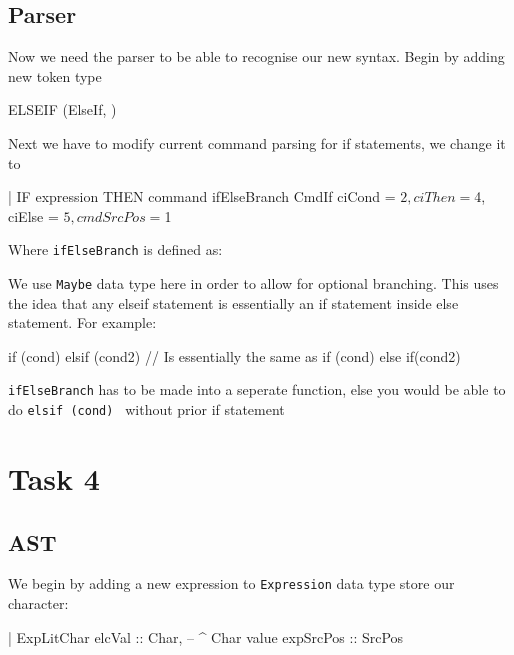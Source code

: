 \documentclass{article}
\begin{document}
\subsection{Parser}
\begin{flushleft}
Now we need the parser to be able to recognise our new syntax. Begin by adding new token type
\end{flushleft}
\begin{code}
ELSEIF      { (ElseIf, $$) }
\end{code}
\begin{flushleft}
Next we have to modify current command parsing for if statements, we change it to
\end{flushleft}
\begin{code}
| IF expression THEN command ifElseBranch
  { CmdIf {ciCond = $2, ciThen = $4, ciElse = $5, cmdSrcPos = $1} }
\end{code}
\begin{flushleft}
Where \texttt{ifElseBranch} is defined as:
\end{flushleft}
\begin{flushleft}
We use \texttt{Maybe} data type here in order to allow for optional branching. This uses the idea that any elseif statement is essentially an if statement inside else statement. For example:
\end{flushleft}
\begin{code}
if (cond) {} elsif (cond2) {}
// Is essentially the same as
if (cond) {} else { if(cond2) {} }
\end{code}
\begin{flushleft}
\texttt{ifElseBranch} has to be made into a seperate function, else you would be able to do \texttt{elsif (cond) {}} without prior if statement
\end{flushleft}

\section{Task 4}

\subsection{AST}
\begin{flushleft}
We begin by adding a new expression to \texttt{Expression} data type store our character:
\end{flushleft}
\begin{code}
| ExpLitChar {
      elcVal    :: Char,            -- ^ Char value
      expSrcPos :: SrcPos
  }
\end{code}
\end{document}
